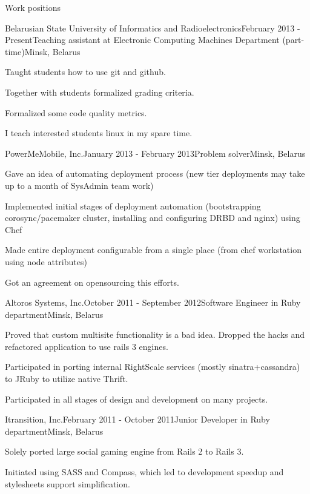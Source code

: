 \documentclass{resume} %
\begin{document}
\begin{rSection}{Work positions}

\begin{rSubsection}{Belarusian State University of Informatics and Radioelectronics}{February 2013 - Present}{Teaching assistant at Electronic Computing Machines Department (part-time)}{Minsk, Belarus}
\item Taught students how to use git and github.
\item Together with students formalized grading criteria.
\item Formalized some code quality metrics.
\item I teach interested students linux in my spare time.
\end{rSubsection}

\begin{rSubsection}{PowerMeMobile, Inc.}{January 2013 - February 2013}{Problem solver}{Minsk, Belarus}
\item Gave an idea of automating deployment process (new tier deployments may take up to
  a month of SysAdmin team work)
\item Implemented initial stages of deployment automation (bootstrapping corosync/pacemaker cluster,
  installing and configuring DRBD and nginx) using Chef
\item Made entire deployment configurable from a single place (from chef workstation using node attributes)
\item Got an agreement on opensourcing this efforts.
\end{rSubsection}

\begin{rSubsection}{Altoros Systems, Inc.}{October 2011 - September 2012}{Software Engineer in Ruby department}{Minsk, Belarus}
\item Proved that custom multisite functionality is a bad idea. Dropped the hacks and refactored application to use rails 3 engines.
\item Participated in porting internal RightScale services (mostly sinatra+cassandra) to JRuby to utilize native Thrift.
\item Participated in all stages of design and development on many projects.
\end{rSubsection}

\begin{rSubsection}{Itransition, Inc.}{February 2011 - October 2011}{Junior Developer in Ruby department}{Minsk, Belarus}
\item Solely ported large social gaming engine from Rails 2 to Rails 3.
\item Initiated using SASS and Compass, which led to development speedup and stylesheets support simplification.
\end{rSubsection}

\end{rSection}
\end{document}
